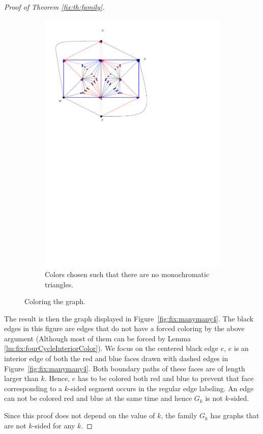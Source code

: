 \begin{proof}[Proof of Theorem \ref{fix:th:family}]
\begin{figure}[h]
\begin{subfigure}[t]{0.3\textwidth}
      \includegraphics[width=\textwidth]{fixExtension/img/manymany3}
      \caption{Colors chosen such that there are no monochromatic triangles.}
      \label{fig:fix:manymany3}
    \end{subfigure}
    \caption{Coloring the graph.}
    \label{fig:fix:coloring}
  \end{figure}

  The result is then the graph displayed in Figure~\ref{fig:fix:manymany4}. The black edges in this figure are edges that do not have a forced coloring by the above argument (Although most of them can be forced by Lemma \ref{lm:fix:fourCycleInteriorColor}).
  We focus on the centered black edge $e$, $e$ is an interior edge of both the red and blue faces drawn with dashed edges in Figure~\ref{fig:fix:manymany4}. Both boundary paths of these faces are of length larger than $k$. Hence, $e$ has to be colored both red and blue to prevent that face corresponding to a $k$-sided segment occurs in the regular edge labeling. An edge can not be colored red and blue at the same time and hence $G_k$ is not $k$-sided.

  Since this proof does not depend on the value of $k$, the family $G_k$ has graphs that are not $k$-sided for any $k$.
\end{proof}


